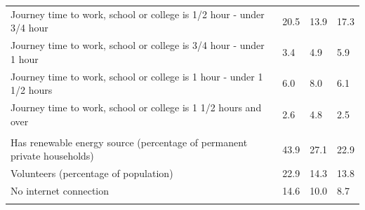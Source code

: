 \documentclass{article}
\begin{document}
\begin{table}[h]
\begin{tabular}{KTTT}
Journey time to work, school or college is 1/2 hour - under 3/4 hour & 20.5& 13.9& 17.3\\
Journey time to work, school or college is 3/4 hour - under 1 hour & 3.4& 4.9& 5.9\\
Journey time to work, school or college is 1 hour - under 1 1/2 hours & 6.0& 8.0& 6.1\\
Journey time to work, school or college is 1 1/2 hours and over & 2.6& 4.8& 2.5\\
\hline
    \\ 
    \hline
Has renewable energy source (percentage of permanent private households) & 43.9& 27.1& 22.9\\
    \hline
Volunteers (percentage of population) & 22.9& 14.3& 13.8\\
    \hline
No internet connection& 14.6& 10.0&  8.7\\
\hline
\end{tabular}
\end{table}
\end{document}
